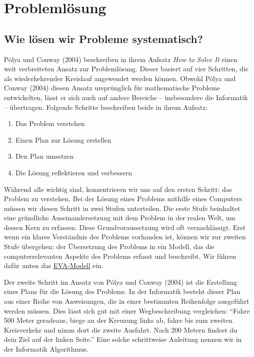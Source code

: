 \documentclass[
  ngerman,
  letterpaper,
  DIV=11]{scrreprt}
\author{}
\date{}
\providecommand{\tightlist}{%
  \setlength{\itemsep}{0pt}\setlength{\parskip}{0pt}}
\begin{document}
\chapter{Problemlösung}\label{problemluxf6sung}

\section{Wie lösen wir Probleme
systematisch?}\label{wie-luxf6sen-wir-probleme-systematisch}

Pólya und Conway (2004) beschreiben in ihrem Aufsatz \emph{How to Solve
It} einen weit verbreiteten Ansatz zur Problemlösung. Dieser basiert auf
vier Schritten, die als wiederkehrender Kreislauf angewendet werden
können. Obwohl Pólya und Conway (2004) diesen Ansatz ursprünglich für
mathematische Probleme entwickelten, lässt er sich auch auf andere
Bereiche -- insbesondere die Informatik -- übertragen. Folgende Schritte
beschreiben beide in ihrem Aufsatz:

\begin{enumerate}
\def\labelenumi{\arabic{enumi}.}
\tightlist
\item
  Das Problem verstehen
\item
  Einen Plan zur Lösung erstellen
\item
  Den Plan umsetzen
\item
  Die Lösung reflektieren und verbessern
\end{enumerate}

Während alle wichtig sind, konzentrieren wir uns auf den ersten Schritt:
das Problem zu verstehen. Bei der Lösung eines Problems mithilfe eines
Computers müssen wir diesen Schritt in zwei Stufen unterteilen. Die
erste Stufe beinhaltet eine gründliche Auseinandersetzung mit dem
Problem in der realen Welt, um dessen Kern zu erfassen. Diese
Grundvoraussetzung wird oft vernachlässigt. Erst wenn ein klares
Verständnis des Problems vorhanden ist, können wir zur zweiten Stufe
übergehen: der Übersetzung des Problems in ein Modell, das die
computerrelevanten Aspekte des Problems erfasst und beschreibt. Wir
führen dafür unten das \hyperref[sec-eva-model]{EVA-Modell} ein.

Der zweite Schritt im Ansatz von Pólya und Conway (2004) ist die
Erstellung eines Plans für die Lösung des Problems. In der Informatik
besteht dieser Plan aus einer Reihe von Anweisungen, die in einer
bestimmten Reihenfolge ausgeführt werden müssen. Dies lässt sich gut mit
einer Wegbeschreibung vergleichen: ``Fahre 500 Meter geradeaus, biege an
der Kreuzung links ab, fahre bis zum zweiten Kreisverkehr und nimm dort
die zweite Ausfahrt. Nach 200 Metern findest du dein Ziel auf der linken
Seite.'' Eine solche schrittweise Anleitung nennen wir in der Informatik
Algorithmus.
\end{document}
